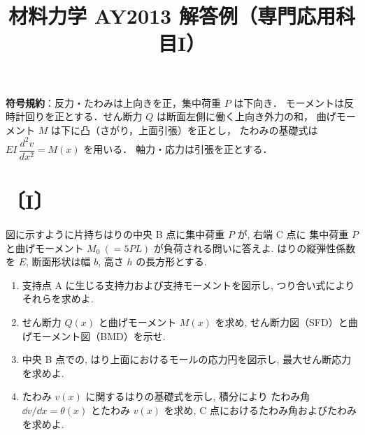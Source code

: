 \documentclass[11pt,a4paper]{article}
\title{材料力学 AY2013 解答例（専門応用科目I）}
\author{}
\date{}
\begin{document}
\maketitle

\noindent\textbf{符号規約}：反力・たわみは上向きを正，集中荷重 $P$ は下向き．
モーメントは反時計回りを正とする．せん断力 $Q$ は断面左側に働く上向き外力の和，
曲げモーメント $M$ は下に凸（さがり，上面引張）を正とし，
たわみの基礎式は $EI\,\dfrac{d^2v}{dx^2}=M(x)$ を用いる．
軸力・応力は引張を正とする．

\section*{〔I〕}

図に示すように片持ちはりの中央 B 点に集中荷重 $P$ が, 右端 C 点に
集中荷重 $P$ と曲げモーメント $M_0\ (=5PL)$ が負荷される問いに答えよ.
はりの縦弾性係数を $E$, 断面形状は幅 $b$, 高さ $h$ の長方形とする.

\begin{center}
\end{center}

\begin{enumerate}[label=(\arabic*)]
  \item 支持点 A に生じる支持力および支持モーメントを図示し,
        つり合い式によりそれらを求めよ.
  \item せん断力 $Q(x)$ と曲げモーメント $M(x)$ を求め,
        せん断力図（SFD）と曲げモーメント図（BMD）を示せ.
  \item 中央 B 点での, はり上面におけるモールの応力円を図示し,
        最大せん断応力を求めよ.
  \item たわみ $v(x)$ に関するはりの基礎式を示し, 積分により
        たわみ角 $\dd v/\dd x=\theta(x)$ とたわみ $v(x)$ を求め,
        C 点におけるたわみ角およびたわみを求めよ.
\end{enumerate}
\end{document}

